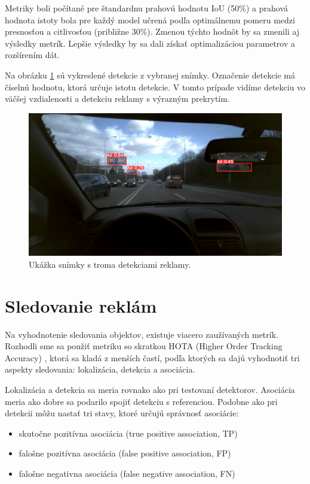 Metriky boli počítané pre štandardnu prahovú hodnotu IoU (50\%) a prahová hodnota istoty bola pre každý model učrená podľa optimálnemu pomeru medzi presnosťou a citlivosťou (približne 30\%). Zmenou týchto hodnôt by sa zmenili aj výsledky metrík. Lepšie výsledky by sa dali získať optimalizáciou parametrov a rozšírením dát.

Na obrázku \ref{img:dt7} sú vykreslené detekcie z vybranej snímky. Označenie detekcie má číselnú hodnotu, ktorá určuje istotu detekcie. V tomto prípade vidíme detekciu vo väčšej vzdialenosti a detekciu reklamy s výrazným prekrytím.

\begin{figure}[ht]
    \centering
    \includegraphics[width=1\textwidth]{images/05/120.jpg}
    \caption{Ukážka snímky s troma detekciami reklamy.}
    \label{img:dt7}
\end{figure}

\section{Sledovanie reklám}

Na vyhodnotenie sledovania objektov, existuje viacero zaužívaných metrík. Rozhodli sme sa použiť metriku so skratkou HOTA (Higher Order Tracking Accuracy) \cite{hota}, ktorá sa kladá z menších častí, podľa ktorých sa dajú vyhodnotiť tri aspekty sledovania: lokalizácia, detekcia a asociácia.

Lokalizácia a detekcia sa meria rovnako ako pri testovaní detektorov. Asociácia meria ako dobre sa podarilo spojiť detekciu s referenciou. Podobne ako pri detekcii môžu nastať tri stavy, ktoré určujú správnosť asociácie:

\begin{itemize}
  \item skutočne pozitívna asociácia (true positive association, TP)
  \item falošne pozitívna asociácia (false positive association, FP)
  \item falošne negativna asociácia (false negative association, FN)
\end{itemize}

